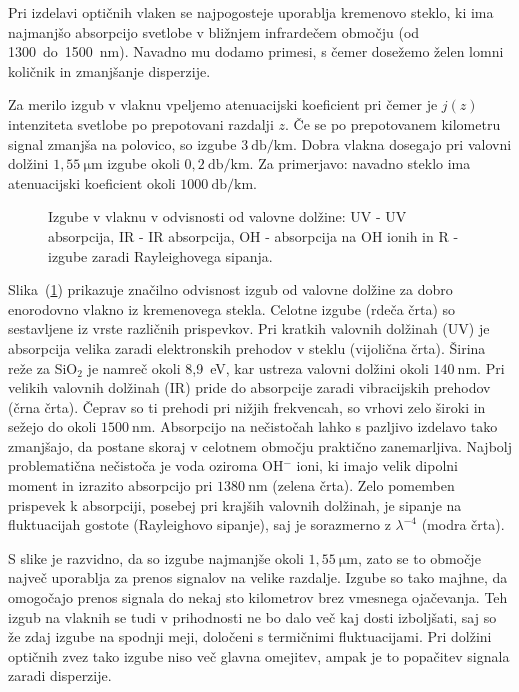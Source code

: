 Pri izdelavi optičnih vlaken se najpogosteje uporablja kremenovo steklo, ki 
ima najmanjšo absorpcijo svetlobe v bližnjem infrardečem območju (od 1300~do~1500~\si{\nano\meter}).
Navadno mu dodamo primesi, s čemer dosežemo želen lomni količnik in 
zmanjšanje disperzije. 

Za merilo izgub v vlaknu vpeljemo atenuacijski koeficient 
pri čemer je $j(z)$ intenziteta svetlobe po prepotovani razdalji $z$. Če se po prepotovanem
kilometru signal zmanjša na polovico, so izgube $3~\si{\decibel/\kilo\meter}$.
Dobra vlakna dosegajo pri valovni dolžini $1,55~\si{\micro\meter}$ izgube okoli 
$0,2~\si{\decibel/\kilo\meter}$. 
Za primerjavo: navadno steklo ima atenuacijski koeficient okoli 
$1000~\si{\decibel/\kilo\meter}$.

\begin{figure}[h]
\centering
\def\svgwidth{90truemm} 
 
\caption{Izgube v vlaknu v odvisnosti od valovne dolžine: UV - UV absorpcija, 
IR - IR absorpcija, OH - absorpcija na OH ionih in R - izgube zaradi Rayleighovega sipanja.}
\label{FibAbs}
\end{figure}
Slika~(\ref{FibAbs}) prikazuje značilno odvisnost izgub od valovne dolžine 
za dobro enorodovno vlakno iz kremenovega stekla. Celotne izgube (rdeča črta)
so sestavljene iz vrste različnih prispevkov. 
Pri kratkih valovnih dolžinah (UV) je absorpcija velika zaradi elektronskih prehodov
v steklu (vijolična črta). Širina reže za SiO$_2$ je namreč okoli 8,9~eV, kar ustreza valovni dolžini
okoli $140~\si{\nano\meter}$. Pri velikih valovnih dolžinah (IR) pride do absorpcije zaradi
vibracijskih prehodov (črna črta). Čeprav so ti prehodi pri nižjih frekvencah, 
so vrhovi zelo široki in sežejo do okoli $1500~\si{\nano\meter}$. Absorpcijo na nečistočah lahko s pazljivo 
izdelavo tako zmanjšajo, da postane skoraj v celotnem območju praktično zanemarljiva. 
Najbolj problematična nečistoča je voda oziroma OH$^{-}$ ioni, ki imajo velik dipolni
moment in izrazito absorpcijo pri $1380~\si{\nano\meter}$ (zelena črta). Zelo pomemben prispevek k 
absorpciji, posebej pri krajših valovnih dolžinah, je sipanje na fluktuacijah 
gostote (Rayleighovo sipanje), saj je sorazmerno z $\lambda^{-4}$ (modra črta). 

S slike je razvidno, da so izgube najmanjše
okoli $1,55~\si{\micro\meter}$, zato se to območje največ uporablja za prenos signalov
na velike razdalje. Izgube so tako majhne, da omogočajo prenos signala 
do nekaj sto kilometrov brez vmesnega ojačevanja. Teh izgub na vlaknih se tudi v prihodnosti 
ne bo dalo več kaj dosti izboljšati, saj so že zdaj izgube na spodnji meji,
določeni s termičnimi fluktuacijami. Pri dolžini optičnih zvez tako izgube niso več glavna
omejitev, ampak je to popačitev signala zaradi disperzije.

